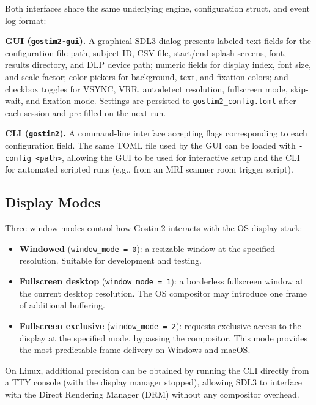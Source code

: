 \documentclass[
  11pt,
]{article}
\providecommand{\tightlist}{%
  \setlength{\itemsep}{0pt}\setlength{\parskip}{0pt}}
\begin{document}
Both interfaces share the same underlying engine, configuration struct,
and event log format:

\textbf{GUI (\texttt{gostim2-gui}).} A graphical SDL3 dialog presents
labeled text fields for the configuration file path, subject ID, CSV
file, start/end splash screens, font, results directory, and DLP device
path; numeric fields for display index, font size, and scale factor;
color pickers for background, text, and fixation colors; and checkbox
toggles for VSYNC, VRR, autodetect resolution, fullscreen mode,
skip-wait, and fixation mode. Settings are persisted to
\texttt{gostim2\_config.toml} after each session and pre-filled on the
next run.

\textbf{CLI (\texttt{gostim2}).} A command-line interface accepting
flags corresponding to each configuration field. The same TOML file used
by the GUI can be loaded with
\texttt{-config\ \textless{}path\textgreater{}}, allowing the GUI to be
used for interactive setup and the CLI for automated scripted runs
(e.g., from an MRI scanner room trigger script).

\subsection{Display Modes}\label{display-modes}

Three window modes control how Gostim2 interacts with the OS display
stack:

\begin{itemize}
\tightlist
\item
  \textbf{Windowed} (\texttt{window\_mode\ =\ 0}): a resizable window at
  the specified resolution. Suitable for development and testing.
\item
  \textbf{Fullscreen desktop} (\texttt{window\_mode\ =\ 1}): a
  borderless fullscreen window at the current desktop resolution. The OS
  compositor may introduce one frame of additional buffering.
\item
  \textbf{Fullscreen exclusive} (\texttt{window\_mode\ =\ 2}): requests
  exclusive access to the display at the specified mode, bypassing the
  compositor. This mode provides the most predictable frame delivery on
  Windows and macOS.
\end{itemize}

On Linux, additional precision can be obtained by running the CLI
directly from a TTY console (with the display manager stopped), allowing
SDL3 to interface with the Direct Rendering Manager (DRM) without any
compositor overhead.
\end{document}
